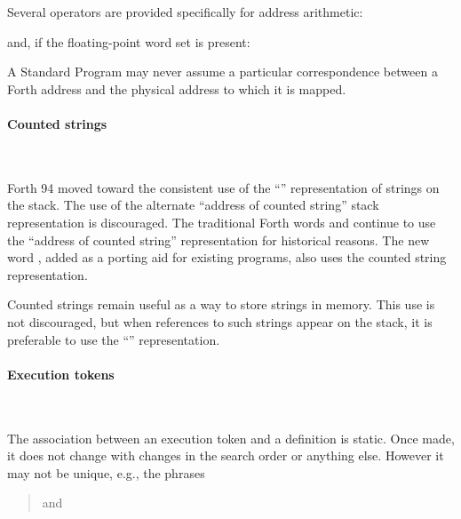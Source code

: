 Several operators are provided specifically for address arithmetic:

\begin{quote}\ttfamily
		
		
\end{quote}

and, if the floating-point word set is present:

\begin{quote}\ttfamily
			
		
		
\end{quote}

A Standard Program may never assume a particular correspondence
between a Forth address and the physical address to which it is
mapped.


\paragraph{Counted strings} ~ %
\label{rat:cstring}

Forth 94 moved toward the consistent use of the ``''
representation of strings on the stack. The use of the alternate
``address of counted string'' stack representation is discouraged.
The traditional Forth words  and  continue
to use the ``address of counted string'' representation for historical
reasons. The new word , added as a porting aid for existing
programs, also uses the counted string representation.

Counted strings remain useful as a way to store strings in memory.
This use is not discouraged, but when references to such strings
appear on the stack, it is preferable to use the ``''
representation.


\paragraph{Execution tokens} ~ %

The association between an execution token and a definition is static.
Once made, it does not change with changes in the search order or
anything else. However it may not be unique, e.g., the phrases

\begin{quote}\ttfamily
	  and \\
	 
\end{quote}

